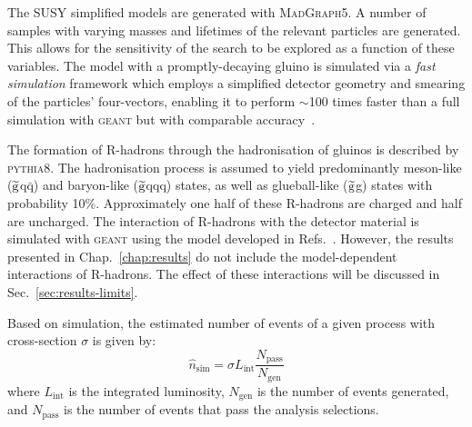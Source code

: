 The SUSY %
simplified models are generated with \textsc{MadGraph5}. A number of samples 
with varying masses and lifetimes of the relevant particles are generated. 
This allows for the sensitivity of the search to be explored as a function of 
these variables.
The model with a promptly-decaying gluino is simulated via a 
\textit{fast simulation} framework which employs a simplified detector geometry 
and smearing of the particles' four-vectors, enabling it to perform $\sim$100 
times faster than a full simulation with \textsc{geant} but with comparable 
accuracy~\cite{fastsim}.


The formation of R-hadrons through the hadronisation of gluinos is described by 
\textsc{pythia8}. The hadronisation process is assumed to yield predominantly 
meson-like ($\mathrm{\widetilde{g}}$q$\bar{\mathrm q}$) and baryon-like ($\mathrm{\widetilde{g}}$qqq) states, 
as well as glueball-like ($\mathrm{\widetilde{g}}$g) states with probability 10\%. 
Approximately one half of these R-hadrons are charged and half are uncharged. 
The interaction of R-hadrons with the detector material is simulated with 
\textsc{geant} using the model developed in 
Refs.~\cite{cloudmodel1,cloudmodel2}. 
However, the results presented in Chap.~\ref{chap:results} do not include the 
model-dependent interactions of R-hadrons. The effect of these interactions 
will be discussed in Sec.~\ref{sec:results-limits}.


Based on simulation, the estimated number of events of a given process with 
cross-section $\sigma$ is given by:
\begin{equation}
\hat{n}_\mathrm{sim} = \sigma L_\mathrm{int} 
\frac{N_{\mathrm{pass}}}{N_{\mathrm{gen}}}
\end{equation}
where $L_\mathrm{int}$ is the integrated luminosity, $N_{\mathrm{gen}}$ is the 
number of events generated, and $N_{\mathrm{pass}}$ is the number of events 
that pass the analysis selections.


